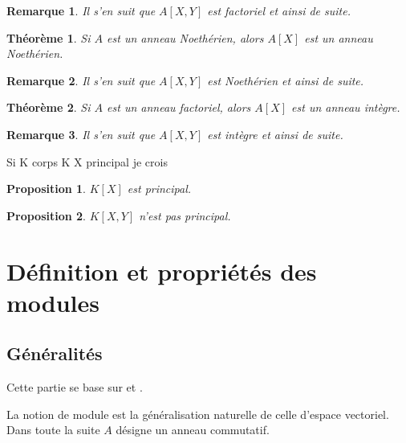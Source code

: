 \documentclass[a4paper,12pt]{report}  %
\theoremstyle{definitionstyle}
\theoremstyle{examplestyle}
\theoremstyle{remarkstyle}
\newtheorem{remark}{Remarque}[chapter] %
\theoremstyle{propositionstyle}
\newtheorem{proposition}{Proposition}[chapter]  %
\theoremstyle{theoremstyle}
\newtheorem{theoreme}{Théorème}[chapter]  %
\theoremstyle{proofstyle}
\begin{document}
	\begin{remark}
		Il s'en suit que $A[X, Y]$ est factoriel et ainsi de suite.
	\end{remark}

	\begin{theoreme}
		Si $A$ est un anneau Noethérien, alors $A[X]$ est un anneau Noethérien.
	\end{theoreme}
	
	\begin{remark}
		Il s'en suit que $A[X, Y]$ est Noethérien et ainsi de suite.
	\end{remark}

	\begin{theoreme}
		Si $A$ est un anneau factoriel, alors $A[X]$ est un anneau intègre.
	\end{theoreme}
	
	\begin{remark}
		Il s'en suit que $A[X, Y]$ est intègre et ainsi de suite.
	\end{remark}

	Si K corps K X principal je crois
	
	\begin{proposition}
		$K[X]$ est principal.
	\end{proposition}

	\begin{proposition}
		$K[X, Y]$ n'est pas principal.
	\end{proposition}
	
	\section{Définition et propriétés des modules} %
	
	\subsection{Généralités}
	Cette partie se base sur \cite{ring_modules} et \cite{harari_modules}.
	
	La notion de module est la généralisation naturelle de celle d'espace vectoriel. Dans toute la suite $A$ désigne un anneau commutatif.
	
\end{document}

